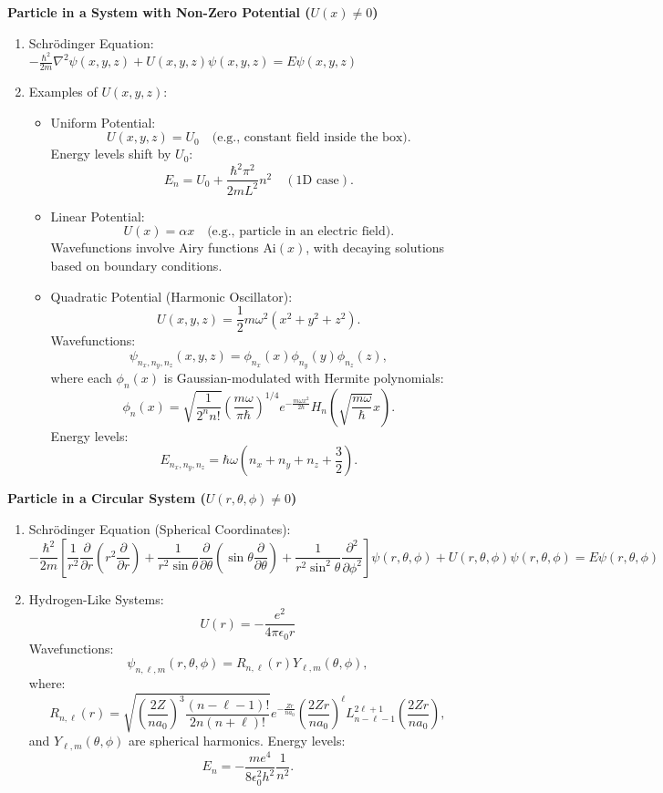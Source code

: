 \documentclass{article}
\begin{document}
\textbf{Particle in a System with Non-Zero Potential (\(U(x) \neq 0\))}

\begin{enumerate}
\item Schrödinger Equation:
\(
-\frac{\hbar^2}{2m} \nabla^2 \psi(x, y, z) + U(x, y, z)\psi(x, y, z) = E \psi(x, y, z)
\)
\item Examples of \(U(x, y, z)\):
\begin{itemize}
    \item Uniform Potential:
    \[
    U(x, y, z) = U_0 \quad \text{(e.g., constant field inside the box)}.
    \]
    Energy levels shift by \(U_0\):
    \[
    E_n = U_0 + \frac{\hbar^2 \pi^2}{2m L^2} n^2 \quad (\text{1D case}).
    \]

    \item Linear Potential:
    \[
    U(x) = \alpha x \quad \text{(e.g., particle in an electric field)}.
    \]
    Wavefunctions involve Airy functions \(\text{Ai}(x)\), with decaying solutions based on boundary conditions.

    \item Quadratic Potential (Harmonic Oscillator):
    \[
    U(x, y, z) = \frac{1}{2} m \omega^2 (x^2 + y^2 + z^2).
    \]
    Wavefunctions:
    \[
    \psi_{n_x, n_y, n_z}(x, y, z) = \phi_{n_x}(x) \phi_{n_y}(y) \phi_{n_z}(z),
    \]
    where each \(\phi_n(x)\) is Gaussian-modulated with Hermite polynomials:
    \[
    \phi_n(x) = \sqrt{\frac{1}{2^n n!}} \left(\frac{m \omega}{\pi \hbar}\right)^{1/4} 
    e^{-\frac{m \omega x^2}{2 \hbar}} H_n\left(\sqrt{\frac{m \omega}{\hbar}} x\right).
    \]
    Energy levels:
    \[
    E_{n_x, n_y, n_z} = \hbar \omega \left(n_x + n_y + n_z + \frac{3}{2}\right).
    \]
\end{itemize}
\end{enumerate}

\textbf{Particle in a Circular System (\(U(r, \theta, \phi) \neq 0\))}

\begin{enumerate}
\item Schrödinger Equation (Spherical Coordinates):
\[
-\frac{\hbar^2}{2m} \left[\frac{1}{r^2} \frac{\partial}{\partial r} \left(r^2 \frac{\partial}{\partial r}\right) 
+ \frac{1}{r^2 \sin \theta} \frac{\partial}{\partial \theta} \left(\sin \theta \frac{\partial}{\partial \theta}\right) 
+ \frac{1}{r^2 \sin^2 \theta} \frac{\partial^2}{\partial \phi^2}\right] \psi(r, \theta, \phi) + U(r, \theta, \phi)\psi(r, \theta, \phi) = E \psi(r, \theta, \phi)
\]

\item Hydrogen-Like Systems:
\[
U(r) = -\frac{e^2}{4 \pi \epsilon_0 r}
\]
Wavefunctions:
\[
\psi_{n, \ell, m}(r, \theta, \phi) = R_{n,\ell}(r) Y_{\ell, m}(\theta, \phi),
\]
where:
\[
R_{n,\ell}(r) = \sqrt{\left(\frac{2Z}{n a_0}\right)^3 \frac{(n-\ell-1)!}{2n(n+\ell)!}} e^{-\frac{Zr}{na_0}} \left(\frac{2Zr}{na_0}\right)^\ell L_{n-\ell-1}^{2\ell+1}\left(\frac{2Zr}{na_0}\right),
\]
and \(Y_{\ell, m}(\theta, \phi)\) are spherical harmonics. Energy levels:
\[
E_n = -\frac{m e^4}{8 \epsilon_0^2 h^2} \frac{1}{n^2}.
\]
\end{enumerate}
\end{document}
